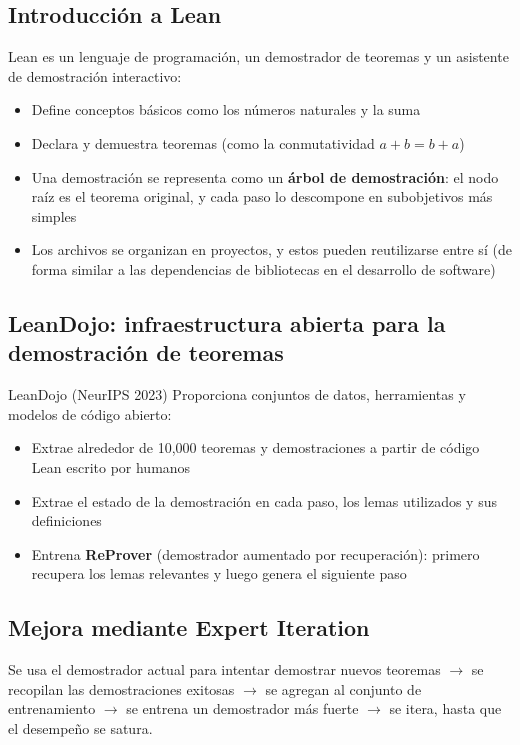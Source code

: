 \documentclass[a4paper]{article}
\begin{document}
\subsection{Introducción a Lean}

Lean es un lenguaje de programación, un demostrador de teoremas y un asistente de demostración interactivo:
\begin{itemize}
    \item Define conceptos básicos como los números naturales y la suma
    \item Declara y demuestra teoremas (como la conmutatividad $a+b=b+a$)
    \item Una demostración se representa como un \textbf{árbol de demostración}: el nodo raíz es el teorema original, y cada paso lo descompone en subobjetivos más simples
    \item Los archivos se organizan en proyectos, y estos pueden reutilizarse entre sí (de forma similar a las dependencias de bibliotecas en el desarrollo de software)
\end{itemize}

\subsection{LeanDojo: infraestructura abierta para la demostración de teoremas}

\begin{importantbox}{LeanDojo (NeurIPS 2023)}
Proporciona conjuntos de datos, herramientas y modelos de código abierto:
\begin{itemize}
    \item Extrae alrededor de 10,000 teoremas y demostraciones a partir de código Lean escrito por humanos
    \item Extrae el estado de la demostración en cada paso, los lemas utilizados y sus definiciones
    \item Entrena \textbf{ReProver} (demostrador aumentado por recuperación): primero recupera los lemas relevantes y luego genera el siguiente paso
\end{itemize}
\end{importantbox}

\subsection{Mejora mediante Expert Iteration}

Se usa el demostrador actual para intentar demostrar nuevos teoremas $\to$ se recopilan las demostraciones exitosas $\to$ se agregan al conjunto de entrenamiento $\to$ se entrena un demostrador más fuerte $\to$ se itera, hasta que el desempeño se satura.
\end{document}
